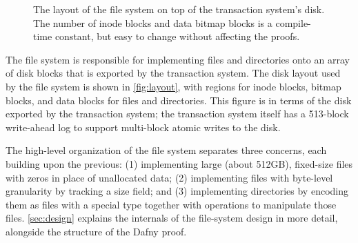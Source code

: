\begin{figure}
  
  \caption{The layout of the file system on top of the transaction system's
    disk. The number of inode blocks and data bitmap blocks is a compile-time
    constant, but easy to change without affecting the proofs.}
  \label{fig:layout}
\end{figure}

The file system is responsible for implementing files and directories
onto an array of disk blocks that is exported by the transaction
system.  The disk layout used by the file system is shown in
\autoref{fig:layout}, with regions for inode blocks, bitmap blocks,
and data blocks for files and directories. This figure is in terms of
the disk exported by the transaction system; the transaction system
itself has a 513-block write-ahead log to support multi-block atomic
writes to the disk.

The high-level organization of the file system separates three concerns, each
building upon the previous: (1) implementing large (about 512GB), fixed-size
files with zeros in place of unallocated data; (2) implementing files with
byte-level granularity by tracking a size field; and (3) implementing
directories by encoding them as files with a special type together with
operations to manipulate those files. \autoref{sec:design} explains the
internals of the file-system design in more detail, alongside the structure of
the Dafny proof.



